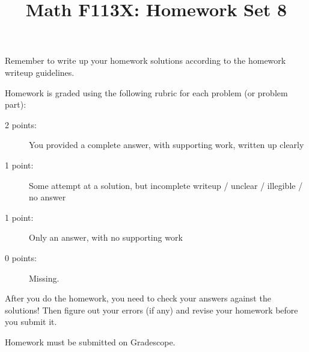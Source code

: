 \documentclass[11pt, oneside]{article}   	%
\title{Math F113X: Homework Set 8}
\date{}							%
\begin{document}
\maketitle




\hrulefill

Remember to write up your homework solutions according to the homework writeup guidelines. 

Homework is graded using the following rubric for each problem (or problem part):

\begin{description}
\item[2 points:] You provided a complete answer, with supporting work, written up clearly
\item[1 point:] Some attempt at a solution, but incomplete writeup / unclear / illegible / no answer
\item[1 point:] Only an answer, with no supporting work 
\item[0 points:] Missing.
\end{description}

After you do the homework, you need to check your answers against the solutions! Then figure out your errors (if any) and revise your homework before you submit it. 

Homework must be submitted on Gradescope.
\end{document}
